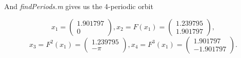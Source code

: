 \documentclass[twoside]{article}
\begin{document}
And {\it findPeriods.m} gives us the 4-periodic orbit

$$x_1 = \begin{pmatrix} 1.901797 \\ 0 \end{pmatrix} , x_2 = F(x_1) = \begin{pmatrix}1.239795 \\ 1.901797 \end{pmatrix} ,$$
$$x_3 = F^2(x_1) = \begin{pmatrix} 1.239795 \\ -\pi \end{pmatrix} , x_4 = F^3(x_1) = \begin{pmatrix} 1.901797 \\ -1.901797 \end{pmatrix} .$$
\end{document}
